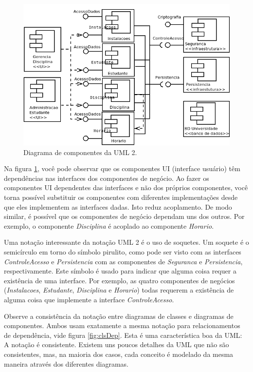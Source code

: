 \begin{figure}
\begin{center}
\includegraphics[scale=0.5]{componente.png}
\end{center}
\caption{Diagrama de componentes da UML 2.} \label{fig:compo}
\end{figure}

Na figura \ref{fig:compo}, você pode observar que os componentes UI (interface usuário) têm dependências nas interfaces dos componentes de negócio. Ao fazer os componentes UI dependentes das interfaces e não dos próprios componentes, você torna possível substituir os componentes com diferentes implementações desde que eles implementem as interfaces dadas. Isto reduz acoplamento. De modo similar, é possível que os componentes de negócio dependam uns dos outros. Por exemplo, o componente \emph{Disciplina} é acoplado ao componente \emph{Horario}. 

Uma notação interessante da notação UML 2 é o uso de soquetes. Um soquete é o semicírculo em torno do símbolo pirulito, como pode ser visto com as interfaces \emph{ControleAcesso} e \emph{Persistencia} com as componentes de \emph{Seguranca} e \emph{Persistencia}, respectivamente. Este símbolo é usado para indicar que alguma coisa requer a existência de uma interface. Por exemplo, as quatro componentes de negócios (\emph{Instalacoes}, \emph{Estudante}, \emph{Disciplina} e \emph{Horario}) todas requerem a existência de alguma coisa que implemente a interface \emph{ControleAcesso}.

Observe a consistência da notação entre diagramas de classes e diagramas de componentes. Ambos usam exatamente a mesma notação para relacionamentos de dependência, vide figura \ref{fig:clsDep}. Esta é uma característica boa da UML: A notação é consistente. Existem uns poucos detalhes da UML que não são consistentes, mas, na maioria dos casos, cada conceito é modelado da mesma maneira através dos diferentes diagramas.

